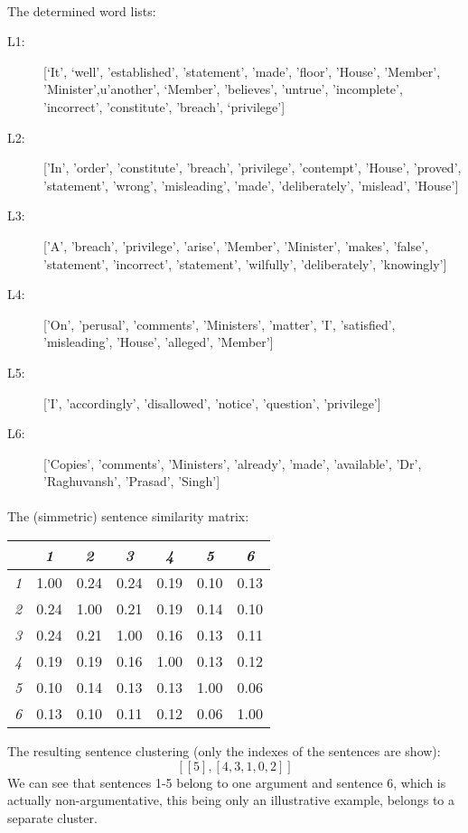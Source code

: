 \paragraph*{}The determined word lists:
\begin{description}
\item[L1:][`It', `well', 'established', 'statement', 'made', 'floor', 'House', 'Member', 'Minister',u'another', `Member', 'believes', 'untrue', 'incomplete', 'incorrect', 'constitute', 'breach', `privilege']
\item[L2:] ['In', 'order', 'constitute', 'breach', 'privilege', 'contempt', 'House', 'proved', 'statement', 'wrong', 'misleading', 'made', 'deliberately', 'mislead', 'House']
\item[L3:] ['A', 'breach', 'privilege', 'arise', 'Member', 'Minister', 'makes', 'false', 'statement', 'incorrect', 'statement', 'wilfully', 'deliberately', 'knowingly']
\item[L4:] ['On', 'perusal', 'comments', 'Ministers', 'matter', 'I', 'satisfied', 'misleading', 'House', 'alleged', 'Member']
\item[L5:] ['I', 'accordingly', 'disallowed', 'notice', 'question', 'privilege']
\item[L6:] ['Copies', 'comments', 'Ministers', 'already', 'made', 'available', 'Dr', 'Raghuvansh', 'Prasad', 'Singh']
\end{description}
\paragraph*{}The (simmetric) sentence similarity matrix:
\begin{center}
  \begin{tabular}{ | l | c | c | c | c | c | c | }
    \hline
	& \emph{1} & \emph{2} & \emph{3} & \emph{4} & \emph{5} & \emph{6} \\ \hline
    \emph{1} & 1.00 & 0.24 & 0.24 & 0.19 & 0.10 & 0.13  \\ \hline
	\emph{2} & 0.24 & 1.00 & 0.21 & 0.19 & 0.14 & 0.10  \\ \hline
	\emph{3} & 0.24 & 0.21 & 1.00 & 0.16 & 0.13 & 0.11  \\ \hline
	\emph{4} & 0.19 & 0.19 & 0.16 & 1.00 & 0.13 & 0.12  \\ \hline
	\emph{5} & 0.10 & 0.14 & 0.13 & 0.13 & 1.00 & 0.06  \\ \hline
	\emph{6} & 0.13 & 0.10 & 0.11 & 0.12 & 0.06 & 1.00  \\ \hline
  \end{tabular}
\end{center}
The resulting sentence clustering (only the indexes of the sentences are show):
\[ [[5], [4, 3, 1, 0, 2]] \]
We can see that sentences 1-5 belong to one argument and sentence 6, which is actually non-argumentative, this being only an illustrative example, belongs to a separate cluster.
